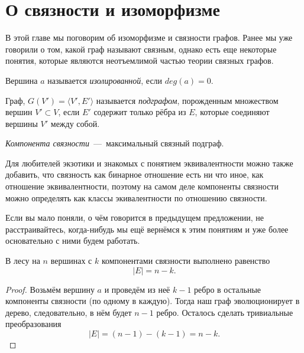 \newpage
\section{О связности и изоморфизме}

В этой главе мы поговорим об изоморфизме и связности графов. Ранее мы уже говорили о том, какой граф называют связным, однако есть еще некоторые понятия, которые являются неотъемлимой частью теории связных графов.


\begin{definition}
	Вершина $a$ называется \emph{изолированной}, если $deg(a) = 0$.
\end{definition}

\begin{definition}
	Граф, $G(V') = \langle V', E' \rangle$ называется \emph{подграфом}, порожденным множеством вершин $V' \subset V$, если $E'$ содержит только рёбра из $E$, которые соединяют вершины $V'$ между собой.
\end{definition}

\begin{definition}
	\emph{Компонента связности}~---~максимальный связный подграф.
\end{definition}

	Для любителей экзотики и знакомых с понятием эквивалентности можно также добавить, что связность как бинарное отношение есть ни что иное, как отношение эквивалентности, поэтому на самом деле компоненты связности можно определять как классы экивалентности по отношению связности.
	
	Если вы мало поняли, о чём говорится в предыдущем предложении, не расстраивайтесь, когда-нибудь мы ещё вернёмся к этим понятиям и уже более основательно с ними будем работать. 

\begin{statement}
	В лесу на $n$ вершинах с $k$ компонентами связности выполнено равенство
	$$|E| = n - k.$$
	
\begin{proof}
	Возьмём вершину $a$ и проведём из неё $k-1$ ребро в остальные компоненты связности (по одному в каждую). Тогда наш граф эволюционирует в дерево, следовательно, в нём будет $n-1$ ребро. Осталось сделать тривиальные преобразования
	$$|E| = (n-1) - (k-1) = n-k.$$
\end{proof}
\end{statement}
	
